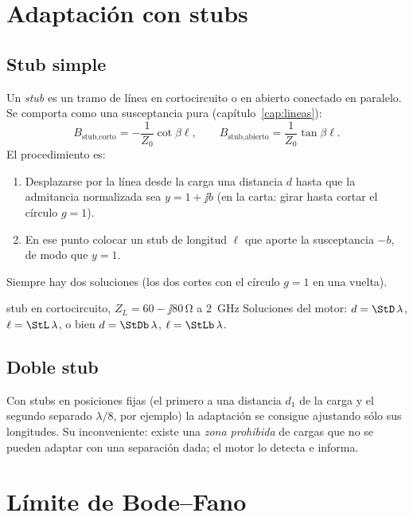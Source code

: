 \section{Adaptación con stubs}

\subsection{Stub simple}
Un \emph{stub} es un tramo de línea en cortocircuito o en abierto conectado en paralelo. Se comporta como una susceptancia pura
(capítulo~\ref{cap:lineas}):
\begin{equation}
  B_{\text{stub,corto}} = -\frac{1}{Z_0}\cot\beta\ell, \qquad B_{\text{stub,abierto}} = \frac{1}{Z_0}\tan\beta\ell .
\end{equation}
El procedimiento es:
\begin{enumerate}
\item Desplazarse por la línea desde la carga una distancia $d$ hasta que la admitancia normalizada sea $y = 1 + \jj b$
(en la carta: girar hasta cortar el círculo $g = 1$).
\item En ese punto colocar un stub de longitud $\ell$ que aporte la susceptancia $-b$, de modo que $y = 1$.
\end{enumerate}
\begin{donde}
\end{donde}
Siempre hay dos soluciones (los dos cortes con el círculo $g=1$ en una vuelta).
\begin{ejemplo}{stub en cortocircuito, $Z_L = 60 - \jj80\,\si{\ohm}$ a \SI{2}{\giga\hertz}}
Soluciones del motor: $d = \StD\,\lambda$, $\ell = \StL\,\lambda$, o bien $d = \StDb\,\lambda$, $\ell = \StLb\,\lambda$.
\end{ejemplo}

\subsection{Doble stub}
Con stubs en posiciones fijas (el primero a una distancia $d_1$ de la carga y el segundo separado $\lambda/8$, por ejemplo) la adaptación se consigue ajustando sólo sus longitudes. Su inconveniente:
existe una \emph{zona prohibida} de cargas que no se pueden adaptar con una separación dada; el motor lo detecta e informa.

\section{Límite de Bode--Fano}

